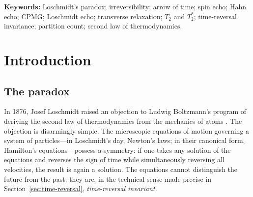 \documentclass[11pt,a4paper]{article}
\theoremstyle{thmstyle}
\theoremstyle{definition}
\theoremstyle{remark}
\begin{document}
\begin{abstract}
We then exhibit the decisive empirical structure, the \emph{Loschmidt
echo progression}: a hierarchy of increasingly ambitious reversal
experiments---Hahn echo, Carr--Purcell--Meiboom--Gill pulse trains, and
genuine many-body Hamiltonian reversal (the magic echo and the
polarization/Loschmidt echo)---in which the more completely one
engineers the reversal, the more sharply an \emph{irreducible floor}
appears whose magnitude is set by the system's own internal dynamics
rather than by the residual imperfection of the engineering. The lab has
been running Loschmidt's own experiment for seventy years; every
refinement confirms the floor. We argue that this floor is a single
object viewed three ways, unifying the homogeneous-relaxation limit, the
non-decrementability of the partition count, and the positivity of the
smallest knowable error of any bounded observer. The completion of the
resolution is therefore not a stronger argument but an empirical fact:
the experiment named after Loschmidt refutes Loschmidt's premise.
\end{abstract}

\noindent\textbf{Keywords:} Loschmidt's paradox; irreversibility; arrow
of time; spin echo; Hahn echo; CPMG; Loschmidt echo; transverse
relaxation; $T_2$ and $T_2^{*}$; time-reversal invariance; partition
count; second law of thermodynamics.

\tableofcontents

\section{Introduction}
\label{sec:intro}

\subsection{The paradox}
\label{sec:the-paradox}

In 1876, Josef Loschmidt raised an objection to Ludwig Boltzmann's
program of deriving the second law of thermodynamics from the mechanics
of atoms \citep{loschmidt1876}. The objection is disarmingly simple. The
microscopic equations of motion governing a system of particles---in
Loschmidt's day, Newton's laws; in their canonical form, Hamilton's
equations---possess a symmetry: if one takes any solution of the
equations and reverses the sign of time while simultaneously reversing
all velocities, the result is again a solution. The equations cannot
distinguish the future from the past; they are, in the technical sense
made precise in Section~\ref{sec:time-reversal}, \emph{time-reversal
invariant}.
\end{document}

